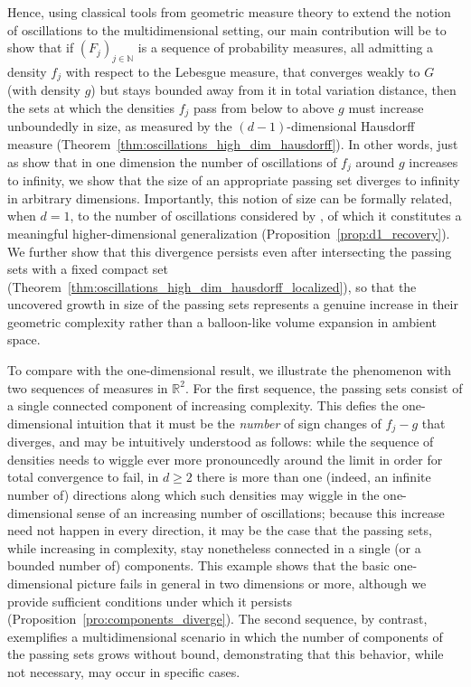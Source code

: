 \documentclass[12pt]{article}
\begin{document}
Hence, using classical tools from geometric measure theory to extend the notion of oscillations to the multidimensional setting, our main contribution will be to show that if $(F_j)_{j\in\mathbb N}$ is a sequence of probability measures, all admitting a density $f_j$ with respect to the Lebesgue measure, that converges weakly to $G$ (with density $g$) but stays bounded away from it in total variation distance, then the sets at which the  densities $f_j$ pass from below to above $g$ must increase unboundedly in size, as measured by the $(d-1)$-dimensional Hausdorff measure (Theorem~\ref{thm:oscillations_high_dim_hausdorff}). In other words, just as \cite{bariletto2025identifiability} show that in one dimension the number of oscillations of $f_j$ around $g$ increases to infinity, we show that the size of an appropriate passing set diverges to infinity in arbitrary dimensions. Importantly, this notion of size can be formally related, when $d=1$, to the number of oscillations considered by \cite{bariletto2025identifiability}, of which it constitutes a meaningful higher-dimensional generalization (Proposition~\ref{prop:d1_recovery}). We further show that this divergence persists even after intersecting the passing sets with a fixed compact set (Theorem~\ref{thm:oscillations_high_dim_hausdorff_localized}), so that the uncovered growth in size of the passing sets represents a genuine increase in their geometric complexity rather than a balloon-like volume expansion in ambient space.

To compare with the one-dimensional result, we illustrate the phenomenon with two sequences of measures in $\mathbb R^2$. For the first sequence, the passing sets consist of a single connected component of increasing complexity. This defies the one-dimensional intuition that it must be the \emph{number} of sign changes of $f_j-g$ that diverges, and may be intuitively understood as follows: while the sequence of densities needs to wiggle ever more pronouncedly around the limit in order for total convergence to fail, in $d\geq 2$ there is more than one (indeed, an infinite number of) directions along which such densities may wiggle in the one-dimensional sense of an increasing number of oscillations; because this increase need not happen in every direction, it may be the case that the passing sets, while increasing in complexity, stay nonetheless connected in a single (or a bounded number of) components. This example shows that the basic one-dimensional picture fails in general in two dimensions or more, although we provide sufficient conditions under which it persists (Proposition~\ref{pro:components_diverge}). The second sequence, by contrast, exemplifies a multidimensional scenario in which the number of components of the passing sets grows without bound, demonstrating that this behavior, while not necessary, may occur in specific cases.
\end{document}
